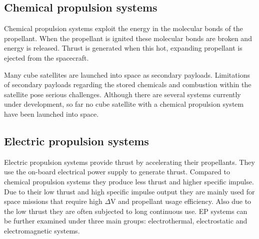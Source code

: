 \subsection{Chemical propulsion systems}
Chemical propulsion systems exploit the energy in the molecular bonds of the propellant. When the propellant is ignited these molecular bonds are broken and energy is released. Thrust is generated when this hot, expanding propellant is ejected from the spacecraft.
\par Many cube satellites are launched into space as secondary payloads. Limitations of secondary payloads regarding the stored chemicals and combustion within the satellite pose serious challenges. Although there are several systems currently under development, so far no cube satellite with a chemical propulsion system have been launched into space\cite{lemmer2017propulsion}.
\subsection{Electric propulsion systems}
Electric propulsion systems provide thrust by accelerating their propellants. They use the on-board electrical power supply to generate thrust. Compared to chemical propulsion systems they produce less thrust and higher specific impulse\cite{Calik2011}. Due to their low thrust and high specific impulse output they are mainly used for space missions that require high $\Delta$V and propellant usage efficiency. Also due to the low thrust they are often subjected to long continuous use. EP systems can be further examined under three main groups: electrothermal, electrostatic and electromagnetic systems\cite{goebel2008fundamentals}.
